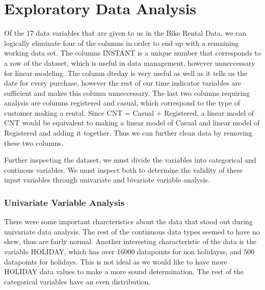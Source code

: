 \documentclass[]{article}
\begin{document}
\section{Exploratory Data Analysis}\label{exploratory-data-analysis}

Of the 17 data variables that are given to us in the Bike Rental Data,
we can logically eliminate four of the columns in order to end up with a
remaining working data set. The columns INSTANT is a unique number that
corresponds to a row of the dataset, which is useful in data management,
however unneccessary for linear modeling. The column dteday is very
useful as well as it tells us the date for every purchase, however the
rest of our time indicator variables are sufficient and makes this
column unneccessary. The last two columns requiring analysis are columns
registered and casual, which correspond to the type of customer making a
rental. Since CNT = Casual + Registered, a linear model of CNT would be
equivalent to making a linear model of Casual and linear model of
Registered and adding it together. Thus we can further clean data by
removing these two columns.

Further inspecting the dataset, we must divide the variables into
categorical and continous variables. We must inspect both to determine
the validity of these input variables through univariate and bivariate
variable analysis.

\subsubsection{Univariate Variable
Analysis}\label{univariate-variable-analysis}

There were some important charcteristics about the data that stood out
during univariate data analysis. The rest of the continuous data types
seemed to have no skew, thus are fairly normal. Another interesting
characteristic of the data is the variable HOLIDAY, which has over 16000
datapoints for non holidayss, and 500 datapoints for holidays. This is
not ideal as we would like to have more HOLIDAY data values to make a
more sound determination. The rest of the categorical variables have an
even distribution.
\end{document}
